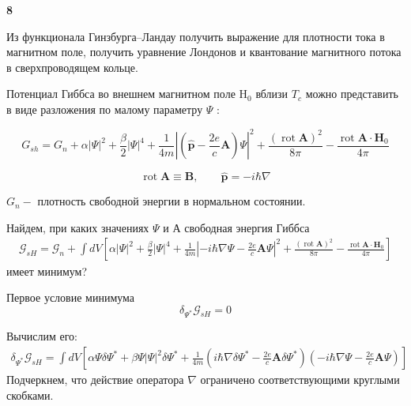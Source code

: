 \documentclass[a4paper,12pt]{article} %
\begin{document}
\begin{task} \textbf{8}



Из функционала Гинзбурга–Ландау получить выражение для плотности тока в магнитном поле, получить уравнение Лондонов и квантование магнитного потока в сверхпроводящем кольце.









Потенциал Гиббса во внешнем магнитном поле $\mathrm{H}_{0}$ вблизи $T_{c}$ можно представить в виде разложения по малому параметру $\Psi$ :



\[ 
G_{s h}=
G_{n}
+
\alpha|\Psi|^{2}
+
\frac{\beta}{2}|\Psi|^{4}
+
\frac{1}{4 m}\left|\left(\hat{\mathbf{p}}-\frac{2 e}{c} \mathbf{A}\right) \Psi\right|^{2}
+
\frac{(\operatorname{rot} \mathbf{A})^{2}}{8 \pi}
-
\frac{\operatorname{rot} \mathbf{A} \cdot \mathbf{H}_{0}}{4 \pi} 
\]


\[ 	
\operatorname{rot} \mathbf{A} \equiv \mathbf{B},
\qquad
\hat{\mathbf{p}}=-i \hbar \nabla 
\]


$G_{n}-$ плотность свободной энергии в нормальном состоянии. 







Найдем, при каких значениях $\Psi$ и А свободная энергия Гиббса
$$
\begin{array}{c}
	\mathcal{G}_{s H}
	=
	\mathcal{G}_{n}
	+
	\int d V \left[
	\alpha|\Psi|^{2}
	+
	\frac{\beta}{2}|\Psi|^{4}
	+
	\frac{1}{4 m}\left|-i \hbar \nabla \Psi-\frac{2 e}{c} \mathbf{A} \Psi\right|^{2}
	+
	\frac{(\operatorname{rot} \mathbf{A})^{2}}{8 \pi}
	-
	\frac{\operatorname{rot} \mathbf{A} \cdot \mathbf{H}_{0}}{4 \pi}\right]
\end{array}
$$
имеет минимум?






Первое условие минимума
$$
\delta_{\Psi^{*}} \mathcal{G}_{s H}=0
$$


Вычислим его:
$$
\begin{array}{c}
	\delta_{\Psi^{*}} \mathcal{G}_{s H}
	=
	\int d V\left[
	\alpha \Psi \delta \Psi^{*}
	+
	\beta \Psi|\Psi|^{2} \delta \Psi^{*}
	+
	\frac{1}{4 m}
	\left(i \hbar \nabla \delta \Psi^{*}
	-
	\frac{2 e}{c} \mathbf{A} \delta \Psi^{*}\right)
	\left(-i \hbar \nabla \Psi-\frac{2 e}{c} \mathbf{A} \Psi\right)
	\right]
\end{array}
$$
Подчеркнем, что действие оператора $\nabla$ ограничено соответствующими круглыми скобками. 



\end{task}
\end{document}
